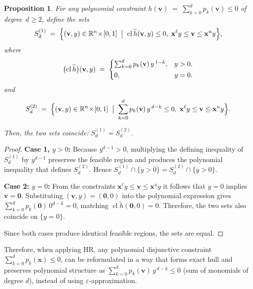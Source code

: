 \documentclass[11pt]{article}
\newtheorem{proposition}{Proposition}
\begin{document}
\begin{appendices}
\begin{proposition}
For any polynomial constraint \(h(\mathbf v)\;=\;\sum_{k=0}^{d} p_k(\mathbf v) \leq 0\) of degree~$d\!\ge\!2$, define the sets
\[
    S_{d}^{(1)}
    \;=\;
    \Bigl\{
        (\mathbf v,y)\in\mathbb R^{n}\!\times\![0,1]
        \;\bigm|\;
        \operatorname{cl}\widetilde h(\mathbf v,y)\le 0,
        \;
        \mathbf x^{\ell}y\le\mathbf v\le \mathbf x^{u}y
    \Bigr\},
\]
where
\begingroup
\begin{equation*}
\setlength{\jot}{0pt}
\begin{aligned}
    \bigl(\operatorname{cl}\widetilde h\bigr)(\mathbf v,y)
    \;=\;
    \begin{cases}
    \sum_{k=0}^{d} p_k(\mathbf v)\,y^{\,1-k}, & y>0,\\[2pt]
        0, & y=0.
    \end{cases}
\end{aligned}
\end{equation*}
\endgroup
and 
\[
    S_{d}^{(2)}
    \;=\;
    \Bigl\{
        (\mathbf v,y)\in\mathbb R^{n}\!\times\![0,1]
        \;\bigm|\;
        \sum_{k=0}^{d} p_k(\mathbf v)\,y^{\,d-k}\le 0,
        \;
        \mathbf x^{\ell}y\le \mathbf v\le \mathbf x^{u}y
    \Bigr\}.
\]



Then, 
the two sets coincide: \(\displaystyle S_{d}^{(1)} = S_{d}^{(2)}\).
\end{proposition}

\begin{proof}
\textbf{Case 1, \(y>0\):}  
Because \(y^{d-1}>0\), multiplying the defining inequality of
\(S_{d}^{(1)}\) by \(y^{d-1}\) preserves the feasible region and produces the
polynomial inequality that defines \(S_{d}^{(2)}\).
Hence \(S_{d}^{(1)}\cap\{y>0\}=S_{d}^{(2)}\cap\{y>0\}\).

\medskip\noindent
\textbf{Case 2: \(y=0\):}  
From the constraints \(\mathbf x^{\ell}y\le\mathbf v\le \mathbf x^{u}y\)
it follows that \(y=0\) implies \(\mathbf v=\mathbf 0\).
Substituting \((\mathbf v,y)=(\mathbf 0,0)\) into the polynomial expression
gives \(\sum_{k=0}^{d}p_k(\mathbf 0)\,0^{d-k}=0\), matching
\(\operatorname{cl}\widetilde h(\mathbf 0,0)=0\).
Therefore, the two sets also coincide on \(\{y=0\}\).

\medskip\noindent
Since both cases produce identical feasible regions, the sets are equal.
\end{proof}



Therefore, when applying HR, any polynomial disjunctive constraint
\(\sum_{k=0}^{d} p_k(\mathbf x) \leq 0\), can be reformulated in a way that forms exact hull and preserves polynomial structure as \( \sum_{k=0}^{d} p_k(\mathbf v)\,y^{\,d-k}\le 0\) (sum of monomials of degree $d$), instead of using $\varepsilon$‐approximation.



\end{appendices}
\end{document}
